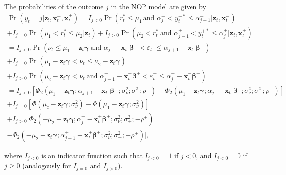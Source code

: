 \documentclass[letterpaper,fleqn,12pt]{article}
\begin{document}
The probabilities of the outcome $j$ in the NOP model are given by%
\begin{equation}
\begin{array}{l}
\Pr (y_{t}=j|\mathbf{z}_{t},\mathbf{x}_{t}^{-},\mathbf{x}_{t}^{+})=I_{j<0}%
\Pr (r_{t}^{\ast }\leq \mu _{1}\ \text{and }\alpha _{j}^{-}<y_{t}^{-\ast
}\leq \alpha _{j+1}^{-}|\mathbf{z}_{t},\mathbf{x}_{t}^{-}) \\ 
+I_{j=0}\Pr (\mu _{1}<r_{t}^{\ast }\leq \mu _{2}|\mathbf{z}_{t})+I_{j>0}\Pr
(\mu _{2}<r_{t}^{\ast }\ \text{and }\alpha _{j-1}^{+}<y_{t}^{+\ast }\leq
\alpha _{j}^{+}|\mathbf{z}_{t},\mathbf{x}_{t}^{+}) \\ 
=I_{j<0}\Pr (\nu _{t}\leq \mu _{1}-\mathbf{z}_{t}\mathbf{\gamma }\ \text{and 
}\alpha _{j}^{-}-\mathbf{x}_{t}^{-}\mathbf{\beta }^{-}<\varepsilon
_{t}^{-}\leq \alpha _{j+1}^{-}-\mathbf{x}_{t}^{-}\mathbf{\beta }^{-}) \\ 
+I_{j=0}\Pr (\mu _{1}-\mathbf{z}_{t}\mathbf{\gamma }<\nu _{t}\leq \mu _{2}-%
\mathbf{z}_{t}\mathbf{\gamma }) \\ 
+I_{j>0}\Pr (\mu _{2}-\mathbf{z}_{t}\mathbf{\gamma }<\nu _{t}\ \text{and }%
\alpha _{j-1}^{+}-\mathbf{x}_{t}^{+}\mathbf{\beta }^{+}<\varepsilon
_{t}^{+}\leq \alpha _{j}^{+}-\mathbf{x}_{t}^{+}\mathbf{\beta }^{+}) \\ 
=I_{j<0}[\Phi _{2}(\mu _{1}-\mathbf{z}_{t}\mathbf{\gamma };\alpha _{j+1}^{-}-%
\mathbf{x}_{t}^{-}\mathbf{\beta }^{-}\mathbf{;}\sigma _{\nu }^{2};\sigma
_{-}^{2};\rho ^{-})-\Phi _{2}(\mu _{1}-\mathbf{z}_{t}\mathbf{\gamma };\alpha
_{j}^{-}-\mathbf{x}_{t}^{-}\mathbf{\beta }^{-}\mathbf{;}\sigma _{\nu
}^{2};\sigma _{-}^{2};\rho ^{-})] \\ 
+I_{j=0}[\Phi (\mu _{2}-\mathbf{z}_{t}\mathbf{\gamma ;}\sigma _{\nu
}^{2})-\Phi (\mu _{1}-\mathbf{z}_{t}\mathbf{\gamma ;}\sigma _{\nu }^{2})] \\ 
+I_{j>0}[\Phi _{2}(-\mu _{2}+\mathbf{z}_{t}\mathbf{\gamma };\alpha _{j}^{+}-%
\mathbf{x}_{t}^{+}\mathbf{\beta }^{+};\sigma _{\nu }^{2};\sigma _{+}^{2};%
\mathbf{-}\rho ^{+}) \\ 
-\Phi _{2}(-\mu _{2}+\mathbf{z}_{t}\mathbf{\gamma };\alpha _{j-1}^{+}-%
\mathbf{x}_{t}^{+}\mathbf{\beta }^{+};\sigma _{\nu }^{2};\sigma _{+}^{2};%
\mathbf{-}\rho ^{+})]\text{,}%
\end{array}
\label{Prob NOP}
\end{equation}

\noindent where $I_{j<0}$ is an indicator function such that $I_{j<0}=1$ if $%
j<0$, and $I_{j<0}=0$ if $j\geq 0$ (analogously for $I_{j=0}$ and $I_{j>0}$).
\end{document}
